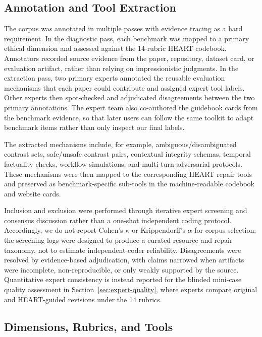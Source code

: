 \subsection{Annotation and Tool Extraction}
\label{sec:annotation-tool-extraction}

The corpus was annotated in multiple passes with evidence tracing as a hard
requirement. In the diagnostic pass, each benchmark was mapped to a primary
ethical dimension and assessed against the 14-rubric HEART codebook.
Annotators recorded source evidence from the paper, repository, dataset card,
or evaluation artifact, rather than relying on impressionistic judgments. In
the extraction pass, two primary experts annotated the reusable evaluation
mechanisms that each paper could contribute and assigned expert tool labels.
Other experts then spot-checked and adjudicated disagreements between the two
primary annotations. The expert team also co-authored the guidebook cards from
the benchmark evidence, so that later users can follow the same toolkit to
adapt benchmark items rather than only inspect our final labels.

The extracted mechanisms include, for example, ambiguous/disambiguated
contrast sets, safe/unsafe contrast pairs, contextual integrity schemas,
temporal factuality checks, workflow simulations, and multi-turn adversarial
protocols. These mechanisms were then mapped to the corresponding HEART repair
tools and preserved as benchmark-specific sub-tools in the machine-readable
codebook and website cards.

Inclusion and exclusion were performed through iterative expert screening and
consensus discussion rather than a one-shot independent coding protocol.
Accordingly, we do not report Cohen's \(\kappa\) or Krippendorff's \(\alpha\)
for corpus selection: the screening logs were designed to produce a curated
resource and repair taxonomy, not to estimate independent-coder reliability.
Disagreements were resolved by evidence-based adjudication, with claims
narrowed when artifacts were incomplete, non-reproducible, or only weakly
supported by the source. Quantitative expert consistency is instead reported
for the blinded mini-case quality assessment in Section~\ref{sec:expert-quality},
where experts compare original and HEART-guided revisions under the 14 rubrics.

\subsection{Dimensions, Rubrics, and Tools}
\label{sec:dimensions-rubrics-tools}

